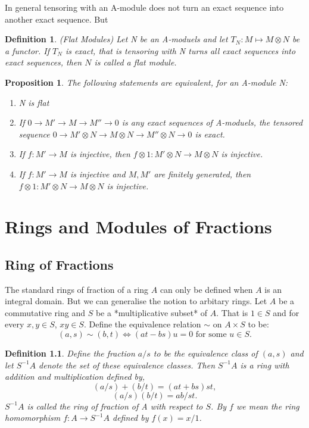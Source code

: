\documentclass[]{report}
\newtheorem{prop}[theorem]{Proposition}
\newtheorem{defn}[theorem]{Definition}
\begin{document}
In general tensoring with an A-module does not turn an exact sequence into another exact sequence. But

\begin{defn} 
    (Flat Modules) Let N be an A-moduels and let $T_N: M\mapsto M\otimes N$ be a functor. If $T_N$ is exact, that is tensoring with N turns all exact sequences into exact sequences, then $N$ is called a flat module. 
\end{defn}

\begin{prop}
    The following statements are equivalent, for an A-module N:
    \begin{enumerate}
        \item N is flat
        \item If $0\rightarrow M' \rightarrow M\rightarrow M'' \rightarrow 0$ is any exact sequences of A-moduels, the tensored sequence $0\rightarrow M'\otimes N\rightarrow M\otimes N\rightarrow M''\otimes N \rightarrow 0$ is exact.
        \item If $f: M' \rightarrow M$ is injective, then $f\otimes 1: M'\otimes N \rightarrow M\otimes N$ is injective.
        \item If $f:M'\rightarrow M$ is injective and $M,M'$ are finitely generated, then $f\otimes 1: M'\otimes N \rightarrow M\otimes N$ is injective. 
    \end{enumerate}
\end{prop}

\chapter{Rings and Modules of Fractions}

\section{Ring of Fractions}

The standard rings of fraction of a ring $A$ can only be defined when $A$ is an integral domain. But we can generalise the notion to arbitary rings. Let $A$ be a commutative ring and $S$ be a *multiplicative subset* of $A$. That is $1\in S$ and for every $x,y\in S$, $xy\in S$. Define the equivalence relation $\sim$ on $A\times S$ to be:
$$(a,s) \sim (b,t) \Leftrightarrow (at-bs)u=0 \text{ for some } u\in S.$$

\begin{defn}
    Define the fraction $a/s$ to be the equivalence class of $(a,s)$ and let $S^{-1}A$ denote the set of these equivalence classes. Then $S^{-1}A$ is a ring with addition and multiplication defined by,
$$(a/s) + (b/t) = (at+bs)st,$$
$$(a/s)(b/t) = ab/st.$$
$S^{-1}A$ is called the ring of fraction of A with respect to $S$. By $f$ we mean the ring homomorphism $f: A \rightarrow S^{-1}A$ defined by $f(x) = x/1$. 
\end{defn}
\end{document}
